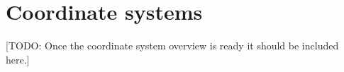 \chapter{Coordinate systems}
\label{ch:coordinates}

[TODO: Once the coordinate system overview is ready it should be included here.]
